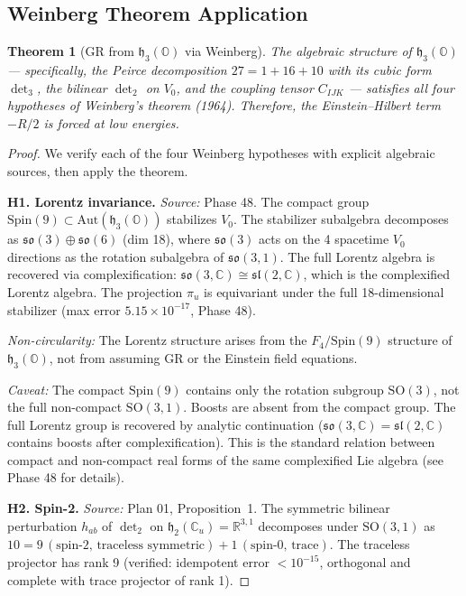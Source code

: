 \documentclass[11pt]{article}
\newtheorem{theorem}{Theorem}
\newcommand{\h}{\mathfrak{h}}
\begin{document}
\subsection{Weinberg Theorem Application}

\begin{theorem}[GR from $\h_3(\mathbb{O})$ via Weinberg]\label{thm:weinberg}
The algebraic structure of $\h_3(\mathbb{O})$ --- specifically, the Peirce
decomposition $27 = 1 + 16 + 10$ with its cubic form $\det_3$, the
bilinear $\det_2$ on $V_0$, and the coupling tensor $C_{IJK}$ ---
satisfies all four hypotheses of Weinberg's theorem (1964). Therefore,
the Einstein--Hilbert term $-R/2$ is forced at low energies.
\end{theorem}

\begin{proof}
We verify each of the four Weinberg hypotheses with explicit algebraic
sources, then apply the theorem.

\medskip
\noindent\textbf{H1. Lorentz invariance.}
\emph{Source:} Phase 48.
The compact group $\mathrm{Spin}(9) \subset \mathrm{Aut}(\h_3(\mathbb{O}))$
stabilizes $V_0$. The stabilizer subalgebra decomposes as
$\mathfrak{so}(3) \oplus \mathfrak{so}(6)$ (dim 18), where $\mathfrak{so}(3)$
acts on the 4 spacetime $V_0$ directions as the rotation subalgebra of
$\mathfrak{so}(3,1)$. The full Lorentz algebra is recovered via
complexification: $\mathfrak{so}(3,\mathbb{C}) \cong \mathfrak{sl}(2,\mathbb{C})$,
which is the complexified Lorentz algebra. The projection $\pi_u$ is
equivariant under the full 18-dimensional stabilizer (max error
$5.15 \times 10^{-17}$, Phase 48).

\emph{Non-circularity:} The Lorentz structure arises from the
$F_4/\mathrm{Spin}(9)$ structure of $\h_3(\mathbb{O})$, not from
assuming GR or the Einstein field equations.

\emph{Caveat:} The compact $\mathrm{Spin}(9)$ contains only the
rotation subgroup $\mathrm{SO}(3)$, not the full non-compact
$\mathrm{SO}(3,1)$. Boosts are absent from the compact group.
The full Lorentz group is recovered by analytic continuation
($\mathfrak{so}(3,\mathbb{C}) = \mathfrak{sl}(2,\mathbb{C})$
contains boosts after complexification). This is the standard
relation between compact and non-compact real forms of the same
complexified Lie algebra (see Phase 48 for details).

\medskip
\noindent\textbf{H2. Spin-2.}
\emph{Source:} Plan 01, Proposition~1.
The symmetric bilinear perturbation $h_{ab}$ of $\det_2$ on
$\h_2(\mathbb{C}_u) = \mathbb{R}^{3,1}$ decomposes under
$\mathrm{SO}(3,1)$ as
$10 = 9\,(\text{spin-2, traceless symmetric}) + 1\,(\text{spin-0, trace})$.
The traceless projector has rank 9 (verified: idempotent error $< 10^{-15}$,
orthogonal and complete with trace projector of rank 1).


\end{proof}
\end{document}
